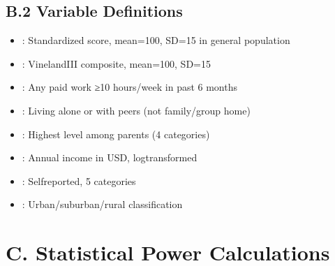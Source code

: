 \documentclass[letterpaper,10pt,english]{jupyterBook}
\begin{document}
\subsection{B.2 Variable Definitions}
\label{\detokenize{appendix:b-2-variable-definitions}}
\sphinxAtStartPar
{}
\begin{itemize}
\item {} 
\sphinxAtStartPar
{}: Standardized score, mean=100, SD=15 in general population

\item {} 
\sphinxAtStartPar
{}: Vineland\sphinxhyphen{}III composite, mean=100, SD=15

\item {} 
\sphinxAtStartPar
{}: Any paid work ≥10 hours/week in past 6 months

\item {} 
\sphinxAtStartPar
{}: Living alone or with peers (not family/group home)

\end{itemize}

\sphinxAtStartPar
{}
\begin{itemize}
\item {} 
\sphinxAtStartPar
{}: Highest level among parents (4 categories)

\item {} 
\sphinxAtStartPar
{}: Annual income in USD, log\sphinxhyphen{}transformed

\item {} 
\sphinxAtStartPar
{}: Self\sphinxhyphen{}reported, 5 categories

\item {} 
\sphinxAtStartPar
{}: Urban/suburban/rural classification

\end{itemize}


\section{C. Statistical Power Calculations}
\label{\detokenize{appendix:c-statistical-power-calculations}}
\end{document}
